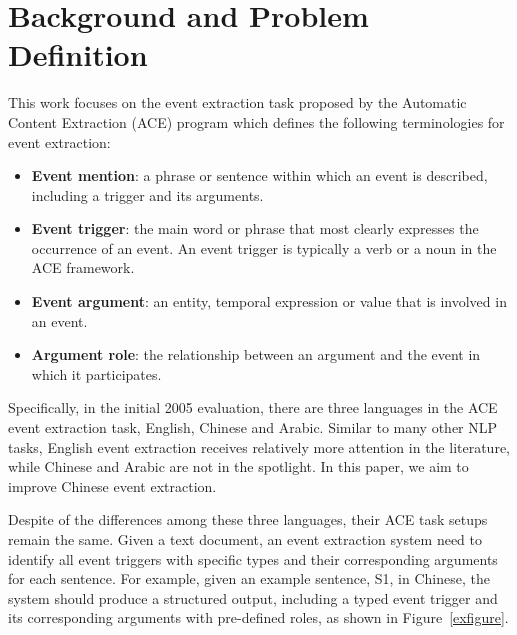 \section{Background and Problem Definition}
\label{background}
This work focuses on the
event extraction task proposed by the Automatic Content Extraction (ACE) program \cite{doddington2004automatic} which
defines the following terminologies for event extraction:

\begin{itemize}
	\item \textbf{Event mention}:  a phrase or sentence within which an event is described, including a trigger and its arguments.
	\item \textbf{Event trigger}: the main word or phrase that most clearly expresses the occurrence of an event. An event trigger is typically a verb or a noun in the ACE framework.
	\item \textbf{Event argument}: an entity, temporal expression or value that is involved in an event.
	\item \textbf{Argument role}: the relationship between an argument and the event in which it participates.
\end{itemize}

Specifically, in the initial 2005 evaluation, there are three languages in the ACE event extraction task,  English, Chinese and Arabic. Similar to many other NLP tasks, English event extraction receives relatively more attention in the literature, while Chinese and Arabic are not in the spotlight.  In this paper, we aim to improve Chinese event extraction.

Despite of the differences among these three languages, their ACE task setups remain the same.
Given a text document, an event extraction system need to identify all event triggers with specific types and their corresponding arguments for each sentence. For example, given an example sentence, S1, in Chinese, the system should produce a structured output, including a typed event trigger  and its corresponding arguments  with pre-defined  roles, as shown in Figure~\ref{exfigure}.

